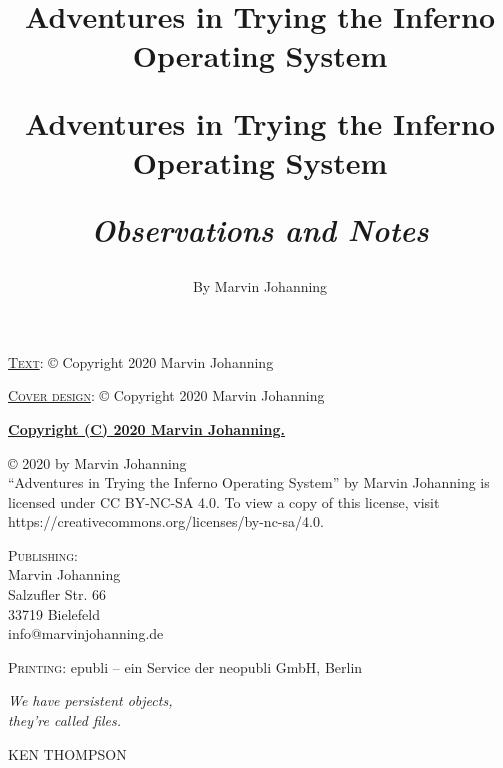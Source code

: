 \documentclass[a5paper,twoside,12pt]{report}
\newlength\longest
\begin{document}

\title{%
  Adventures in Trying the Inferno Operating System
}
\date{}
\author{}
\maketitle

\thispagestyle{empty}
  \mbox{}
  \newpage

\title{%
  Adventures in Trying the Inferno Operating System \\
  \begin{center}\textit{Observations and Notes}\end{center}
  \author{By Marvin Johanning}
}
\maketitle

\thispagestyle{empty}
\noindent\textsc{\underline{Text}}: © Copyright 2020 Marvin Johanning

\noindent\textsc{\underline{Cover design}}: © Copyright 2020 Marvin Johanning

\vspace{8mm}\noindent\textbf{\underline{Copyright (C) 2020 Marvin Johanning.}}

\noindent© 2020 by Marvin Johanning\\``Adventures in Trying the Inferno Operating System'' by Marvin Johanning is licensed under CC BY-NC-SA 4.0. To view a copy of this license, visit https://creativecommons.org\allowbreak/licenses/by-nc-sa/4.0.

\vspace{20mm}\noindent\textsc{Publishing}: \\
Marvin Johanning\\
Salzufler Str. 66\\
33719 Bielefeld\\
info@marvinjohanning.de

\vspace{25mm}\noindent\textsc{Printing}: epubli – ein Service der neopubli GmbH, Berlin
\newpage

\clearpage
\thispagestyle{empty}
\null\vfill
\settowidth{}
\begin{center}
\parbox{\longest}{%
  \raggedright{\huge\itshape%
    We have persistent objects, \\they're called files. \par\bigskip
  }
  \raggedleft\Large\MakeUppercase{Ken Thompson}\par%
}
\vfill\vfill
\clearpage\newpage
\end{center}
\end{document}
